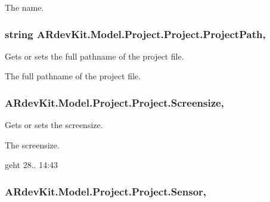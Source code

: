 The name. \hypertarget{class_a_rdev_kit_1_1_model_1_1_project_1_1_project_ad1061c35bc3ffb4caefebce4f22c365c}{
\subsubsection[{Project\-Path}]{\setlength{\rightskip}{0pt plus 5cm}string A\-Rdev\-Kit.\-Model.\-Project.\-Project.\-Project\-Path\hspace{0.3cm}{\ttfamily [get]}, {\ttfamily [set]}}}\label{class_a_rdev_kit_1_1_model_1_1_project_1_1_project_ad1061c35bc3ffb4caefebce4f22c365c}


Gets or sets the full pathname of the project file. 

The full pathname of the project file. \hypertarget{class_a_rdev_kit_1_1_model_1_1_project_1_1_project_afe6b2e85505c01075fbc52a0cc851ce9}{
\subsubsection[{Screensize}]{ A\-Rdev\-Kit.\-Model.\-Project.\-Project.\-Screensize\hspace{0.3cm}{\ttfamily [get]}, {\ttfamily [set]}}}\label{class_a_rdev_kit_1_1_model_1_1_project_1_1_project_afe6b2e85505c01075fbc52a0cc851ce9}


Gets or sets the screensize. 

The screensize. 

geht 28.. 14\-:43\hypertarget{class_a_rdev_kit_1_1_model_1_1_project_1_1_project_ac22f350013113d1e85605346d824cbc1}{
\subsubsection[{Sensor}]{ A\-Rdev\-Kit.\-Model.\-Project.\-Project.\-Sensor\hspace{0.3cm}{\ttfamily [get]}, {\ttfamily [set]}}}\label{class_a_rdev_kit_1_1_model_1_1_project_1_1_project_ac22f350013113d1e85605346d824cbc1}


